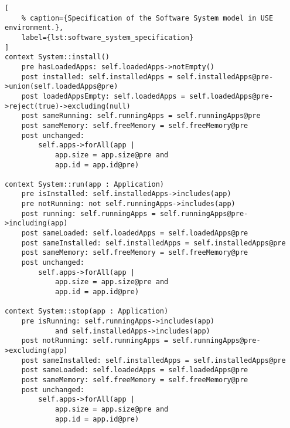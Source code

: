 \begin{lstlisting}[
    % caption={Specification of the Software System model in USE environment.},
    label={lst:software_system_specification}
]
context System::install()
    pre hasLoadedApps: self.loadedApps->notEmpty()
    post installed: self.installedApps = self.installedApps@pre->union(self.loadedApps@pre)
    post loadedAppsEmpty: self.loadedApps = self.loadedApps@pre->reject(true)->excluding(null)
    post sameRunning: self.runningApps = self.runningApps@pre
    post sameMemory: self.freeMemory = self.freeMemory@pre
    post unchanged:
        self.apps->forAll(app |
            app.size = app.size@pre and
            app.id = app.id@pre)

context System::run(app : Application)
    pre isInstalled: self.installedApps->includes(app)
    pre notRunning: not self.runningApps->includes(app)
    post running: self.runningApps = self.runningApps@pre->including(app)
    post sameLoaded: self.loadedApps = self.loadedApps@pre
    post sameInstalled: self.installedApps = self.installedApps@pre
    post sameMemory: self.freeMemory = self.freeMemory@pre
    post unchanged:
        self.apps->forAll(app |
            app.size = app.size@pre and
            app.id = app.id@pre)

context System::stop(app : Application)
    pre isRunning: self.runningApps->includes(app)
            and self.installedApps->includes(app)
    post notRunning: self.runningApps = self.runningApps@pre->excluding(app)
    post sameInstalled: self.installedApps = self.installedApps@pre
    post sameLoaded: self.loadedApps = self.loadedApps@pre
    post sameMemory: self.freeMemory = self.freeMemory@pre
    post unchanged:
        self.apps->forAll(app |
            app.size = app.size@pre and
            app.id = app.id@pre)
\end{lstlisting}

